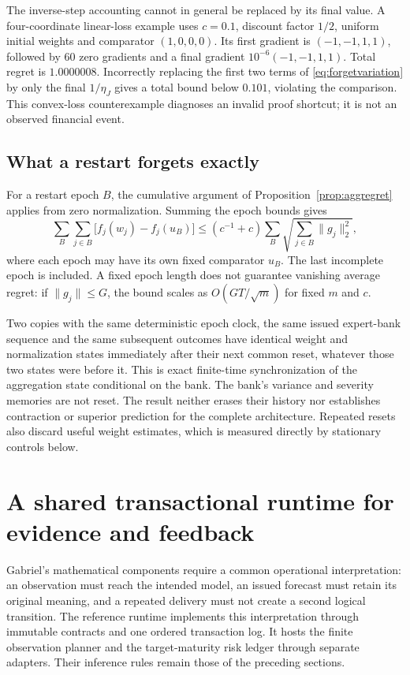 \documentclass[11pt,a4paper]{article}
\theoremstyle{definition}\newtheorem{definition}[theorem]{Definition}
\begin{document}
The inverse-step accounting cannot in general be replaced by its final value. A four-coordinate linear-loss example uses $c=0.1$, discount factor $1/2$, uniform initial weights and comparator $(1,0,0,0)$. Its first gradient is $(-1,-1,1,1)$, followed by 60 zero gradients and a final gradient $10^{-6}(-1,-1,1,1)$. Total regret is $1.0000008$. Incorrectly replacing the first two terms of \eqref{eq:forgetvariation} by only the final $1/\eta_J$ gives a total bound below $0.101$, violating the comparison. This convex-loss counterexample diagnoses an invalid proof shortcut; it is not an observed financial event.

\subsection{What a restart forgets exactly}
For a restart epoch $B$, the cumulative argument of Proposition~\ref{prop:aggregret} applies from zero normalization. Summing the epoch bounds gives
\begin{equation}
 \sum_B\sum_{j\in B}\bigl[f_j(w_j)-f_j(u_B)\bigr]
 \le(c^{-1}+c)\sum_B\sqrt{\sum_{j\in B}\|g_j\|_2^2},
 \label{eq:forgetrestartbound}
\end{equation}
where each epoch may have its own fixed comparator $u_B$. The last incomplete epoch is included. A fixed epoch length does not guarantee vanishing average regret: if $\|g_j\|\le G$, the bound scales as $O(GT/\sqrt m)$ for fixed $m$ and $c$.

Two copies with the same deterministic epoch clock, the same issued expert-bank sequence and the same subsequent outcomes have identical weight and normalization states immediately after their next common reset, whatever those two states were before it. This is exact finite-time synchronization of the aggregation state conditional on the bank. The bank's variance and severity memories are not reset. The result neither erases their history nor establishes contraction or superior prediction for the complete architecture. Repeated resets also discard useful weight estimates, which is measured directly by stationary controls below.

\section{A shared transactional runtime for evidence and feedback}\label{sec:runtime}
Gabriel's mathematical components require a common operational interpretation: an observation must reach the intended model, an issued forecast must retain its original meaning, and a repeated delivery must not create a second logical transition. The reference runtime implements this interpretation through immutable contracts and one ordered transaction log. It hosts the finite observation planner and the target-maturity risk ledger through separate adapters. Their inference rules remain those of the preceding sections.
\end{document}
